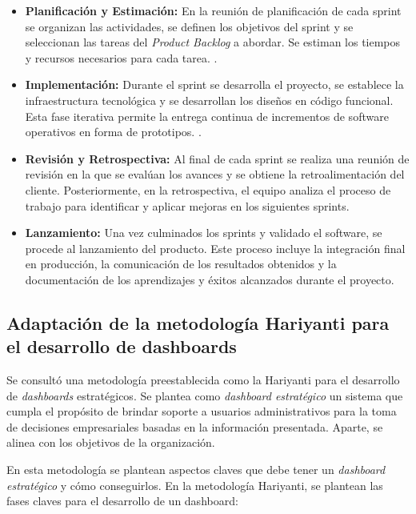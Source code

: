 \documentclass[spanish]{ieee_upb}
\begin{document}
\begin{itemize}
 \item \textbf{Planificación y Estimación:} En la reunión de planificación de cada 
 sprint se organizan las actividades, 
 se definen los objetivos del sprint y 
 se seleccionan las tareas del \textit{Product Backlog} a abordar.
  Se estiman los tiempos y recursos necesarios para cada tarea. \cite{Schwaber2004,Cohn2005}.

 \item \textbf{Implementación:} Durante el sprint se desarrolla el proyecto, 
 se establece la infraestructura tecnológica y se desarrollan los diseños en 
 código funcional. Esta fase iterativa permite la entrega continua de incrementos 
 de software operativos en forma de prototipos. \cite{Sutherland2014}.
 
 \item \textbf{Revisión y Retrospectiva:} Al final de cada sprint se realiza
  una reunión de revisión en la que se evalúan los avances y 
  se obtiene la retroalimentación del cliente. 
  Posteriormente, en la retrospectiva, el equipo analiza el proceso de trabajo 
  para identificar y aplicar mejoras en los siguientes sprints.

 \item \textbf{Lanzamiento:} Una vez culminados los sprints y validado el software, 
 se procede al lanzamiento del producto. Este proceso incluye la integración final 
 en producción, la comunicación de los resultados obtenidos y la documentación de 
 los aprendizajes y éxitos alcanzados durante el proyecto.
\end{itemize}


\subsection{Adaptación de la metodología Hariyanti para el desarrollo de dashboards}

Se consultó una metodología preestablecida como la Hariyanti\cite{hariyanti-dashboard} para el
 desarrollo de \textit{dashboards} estratégicos. Se plantea como \textit{dashboard estratégico} un sistema que cumpla 
el propósito de brindar soporte a usuarios administrativos para la toma de decisiones 
empresariales basadas en la información presentada. Aparte, se alinea con los objetivos de la organización.\cite{hariyanti-dashboard}

\vspace{0.3cm}

En esta metodología se plantean aspectos claves que debe tener un \textit{dashboard estratégico} y cómo conseguirlos.
En la metodología Hariyanti, se plantean las fases claves para el desarrollo de un dashboard:
\end{document}
